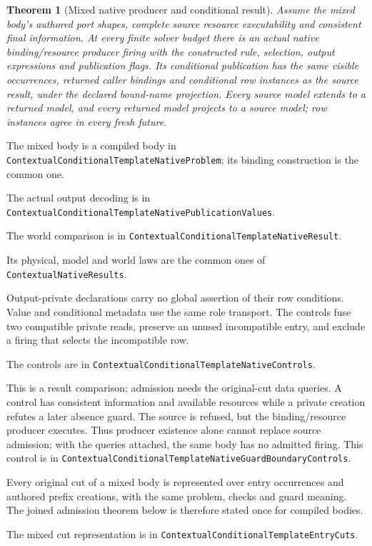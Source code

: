 \documentclass[11pt]{article}
\newtheorem{theorem}{Theorem}
\newcommand{\code}[1]{\texttt{\small #1}}
\begin{document}
\begin{theorem}[Mixed native producer and conditional result]
Assume the mixed body's authored port shapes, complete source resource
executability and consistent final information. At every finite solver
budget there is an actual native binding/resource producer firing with
the constructed rule, selection, output expressions and publication
flags. Its conditional publication has the same visible occurrences,
returned caller bindings and conditional row instances as the source
result, under the declared bound-name projection. Every source model
extends to a returned model, and every returned model projects to a source
model; row instances agree in every fresh future.
\end{theorem}
The mixed body is a compiled body in
\code{ContextualConditionalTemplateNativeProblem}; its binding construction
is the common one.

The actual output decoding is in
\code{ContextualConditionalTemplateNativePublicationValues}.

The world comparison is in
\code{ContextualConditionalTemplateNativeResult}.

Its physical, model and world laws are the common ones of
\code{ContextualNativeResults}.

Output-private declarations carry no global assertion of their row
conditions. Value and conditional metadata use the same role transport.
The controls fuse two compatible private reads, preserve an unused
incompatible entry, and exclude a firing that selects the incompatible
row.

The controls are in
\code{ContextualConditionalTemplateNativeControls}.

This is a result comparison; admission needs the original-cut data
queries. A control has consistent information and available resources
while a private creation refutes a later absence guard. The source is
refused, but the binding/resource producer executes. Thus producer
existence alone cannot replace source admission; with the queries
attached, the same body has no admitted firing. This control is in
\code{ContextualConditionalTemplateNativeGuardBoundaryControls}.

Every original cut of a mixed body is represented over entry occurrences
and authored prefix creations, with the same problem, checks and guard
meaning. The joined admission theorem below is therefore stated once for
compiled bodies.

The mixed cut representation is in
\code{ContextualConditionalTemplateEntryCuts}.
\end{document}
